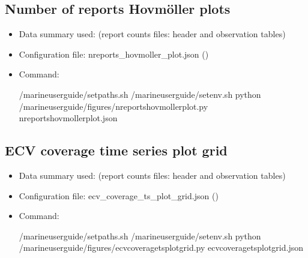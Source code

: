 \documentclass[letterpaper,10pt,english]{sphinxmanual}
\begin{document}
\subsection{Number of reports Hovmöller plots}
\label{\detokenize{index:number-of-reports-hovmoller-plots}}\begin{itemize}
\item {} 
Data summary used: {\hyperref[\detokenize{index:monthly-grids-um-section}]{}} (report counts files: header and observation tables)

\item {} 
Configuration file: nreports\_hovmoller\_plot.json ({\hyperref[\detokenize{index:nreports-hovmoller-config}]{}})

\item {} 
Command:

\begin{sphinxVerbatim}[commandchars=\\\{\}]
 /marine\PYGZhy{}user\PYGZhy{}guide/setpaths.sh
 /marine\PYGZhy{}user\PYGZhy{}guide/setenv.sh
python /marine\PYGZhy{}user\PYGZhy{}guide/figures/nreports\PYGZus{}hovmoller\PYGZus{}plot.py nreports\PYGZus{}hovmoller\PYGZus{}plot.json
\end{sphinxVerbatim}

\end{itemize}


\subsection{ECV coverage time series plot grid}
\label{\detokenize{index:ecv-coverage-time-series-plot-grid}}\begin{itemize}
\item {} 
Data summary used: {\hyperref[\detokenize{index:monthly-grids-um-section}]{}} (report counts files: header and observation tables)

\item {} 
Configuration file: ecv\_coverage\_ts\_plot\_grid.json ({\hyperref[\detokenize{index:ecv-coverage-config}]{}})

\item {} 
Command:

\begin{sphinxVerbatim}[commandchars=\\\{\}]
 /marine\PYGZhy{}user\PYGZhy{}guide/setpaths.sh
 /marine\PYGZhy{}user\PYGZhy{}guide/setenv.sh
python /marine\PYGZhy{}user\PYGZhy{}guide/figures/ecv\PYGZus{}coverage\PYGZus{}ts\PYGZus{}plot\PYGZus{}grid.py ecv\PYGZus{}coverage\PYGZus{}ts\PYGZus{}plot\PYGZus{}grid.json
\end{sphinxVerbatim}

\end{itemize}
\end{document}

